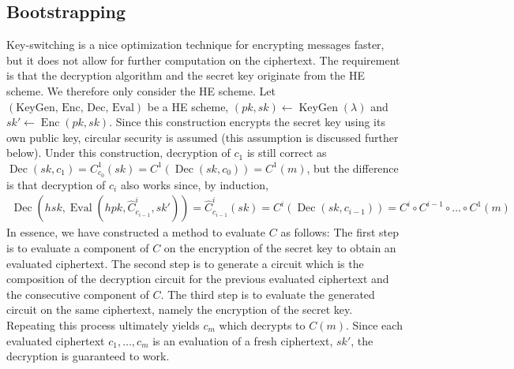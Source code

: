 \subsection*{Bootstrapping}
Key-switching is a nice optimization technique for encrypting messages faster, but it does not allow for further computation on the ciphertext. The requirement is that the decryption algorithm and the secret key originate from the HE scheme. We therefore only consider the HE scheme. Let $(\text{KeyGen, Enc, Dec, Eval})$ be a HE scheme, $(pk, sk) \leftarrow \operatorname{KeyGen}(\lambda)$ and $sk' \leftarrow \operatorname{Enc}(pk, sk)$. Since this construction encrypts the secret key using its own public key, circular security is assumed (this assumption is discussed further below). Under this construction, decryption of $c_1$ is still correct as $\operatorname{Dec}(sk, c_1) = C^1_{c_0}(sk) = C^1(\operatorname{Dec}(sk,c_0)) = C^1(m)$, but the difference is that decryption of $c_i$ also works since, by induction,
\begin{equation*}
    \begin{aligned}
        \operatorname{Dec}(hsk,\operatorname{Eval}(hpk,\hat{C}^i_{c_{i-1}}, sk')) = \hat{C}^i_{c_{i-1}}(sk) = C^i(\operatorname{Dec}(sk, c_{i-1})) = C^i \circ C^{i-1} \circ  \dots \circ C^1(m)
    \end{aligned}
\end{equation*}
In essence, we have constructed a method to evaluate $C$ as follows: The first step is to evaluate a component of $C$ on the encryption of the secret key to obtain an evaluated ciphertext. The second step is to generate a circuit which is the composition of the decryption circuit for the previous evaluated ciphertext and the consecutive component of $C$. The third step is to evaluate the generated circuit on the same ciphertext, namely the encryption of the secret key. Repeating this process ultimately yields $c_m$ which decrypts to $C(m)$. Since each evaluated ciphertext $c_1, \dots, c_m$ is an evaluation of a fresh ciphertext, $sk'$, the decryption is guaranteed to work. 

